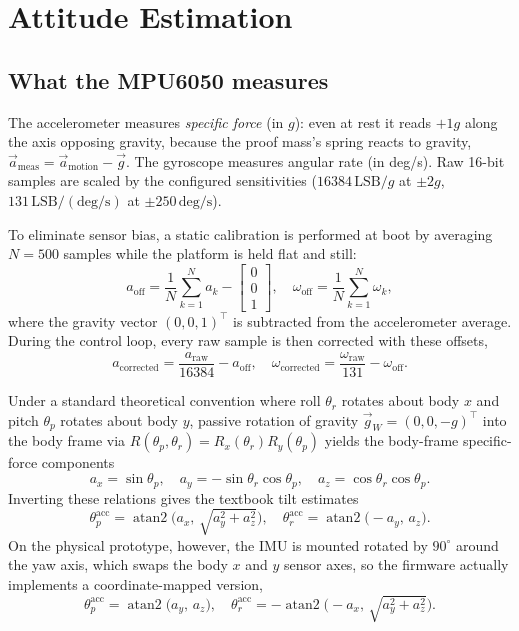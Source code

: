\documentclass[conference]{IEEEtran}
\begin{document}
\section{Attitude Estimation}
\subsection{What the MPU6050 measures}
The accelerometer measures \emph{specific force} (in $g$): even at rest it reads
$+1g$ along the axis opposing gravity, because the proof mass's spring reacts to
gravity, $\vec a_\text{meas} = \vec a_\text{motion} - \vec g$. The gyroscope
measures angular rate (in deg/s). Raw 16-bit samples are scaled by the
configured sensitivities ($16384\,\text{LSB}/g$ at $\pm2g$,
$131\,\text{LSB}/(\text{deg/s})$ at $\pm250\,\text{deg/s}$).

To eliminate sensor bias, a static calibration is performed at boot by averaging $N=500$ samples while the platform is held flat and still:
\begin{equation}
  a_\text{off} = \frac{1}{N}\sum_{k=1}^{N} a_k - \begin{bmatrix} 0\\0\\1 \end{bmatrix},\quad
  \omega_\text{off} = \frac{1}{N}\sum_{k=1}^{N} \omega_k,
\end{equation}
where the gravity vector $(0,0,1)^\top$ is subtracted from the accelerometer average. During the control loop, every raw sample is then corrected with these offsets,
\begin{equation}
  a_\text{corrected} = \frac{a_\text{raw}}{16384} - a_\text{off},\quad
  \omega_\text{corrected} = \frac{\omega_\text{raw}}{131} - \omega_\text{off}.
\end{equation}

Under a standard theoretical convention where roll $\theta_r$ rotates about body $x$ and pitch $\theta_p$ rotates about body $y$, passive rotation of gravity $\vec g_W = (0,0,-g)^\top$ into the body frame via $R(\theta_p, \theta_r) = R_x(\theta_r) R_y(\theta_p)$ yields the body-frame specific-force components
\begin{equation}
  a_x = \sin\theta_p,\quad a_y = -\sin\theta_r\cos\theta_p,\quad a_z = \cos\theta_r\cos\theta_p.
\end{equation}
Inverting these relations gives the textbook tilt estimates
\begin{equation}
  \theta_p^\text{acc} = \operatorname{atan2}\big(a_x,\,\sqrt{a_y^2+a_z^2}\big),\quad
  \theta_r^\text{acc} = \operatorname{atan2}\big(-a_y,\,a_z\big).
\end{equation}
On the physical prototype, however, the IMU is mounted rotated by $90^\circ$ around the yaw axis, which swaps the body $x$ and $y$ sensor axes, so the firmware actually implements a coordinate-mapped version,
\begin{equation}
  \theta_p^\text{acc} = \operatorname{atan2}\!\big(a_y,\,a_z\big),\quad
  \theta_r^\text{acc} = -\operatorname{atan2}\!\Big(\!-a_x,\,\sqrt{a_y^2+a_z^2}\Big).
\end{equation}
\end{document}
